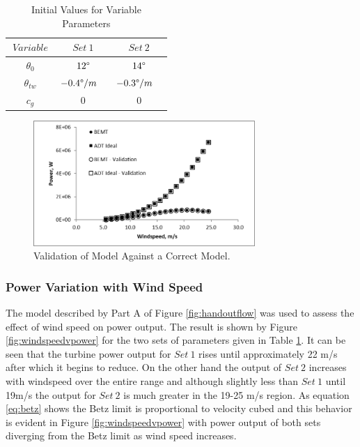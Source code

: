 \documentclass[11pt]{article}
\newcommand{\ra}[1]{\renewcommand{\arraystretch}{#1}}
\begin{document}
\begin{table}[!h]
\centering %
\ra{1.3}
\begin{tabular}{@{}ccc@{}}\toprule
 $\ Variable \ $ & $Set \ 1$ &  $Set \ 2 $\\
\midrule
$\theta_0$ & $ 12\degree$ & $ 14\degree$ \\
$\theta_{tw}$ & $ -0.4\degree/m$ \ & $ -0.3\degree/m$ \ \\
$c_{g}$ & 0 & 0\\
\bottomrule
\end{tabular}
\caption{Initial Values for Variable Parameters}
\label{table:setvar}
\end{table}


\begin{figure}
\centering
	\includegraphics[width=0.75\textwidth]{validation}
	\caption{Validation of Model Against a Correct Model.}\label{fig:validation}
\end{figure}
 \FloatBarrier
\subsubsection{Power Variation with Wind Speed}
The model described by Part A  of Figure \ref{fig:handoutflow} was used to assess the effect of wind speed on power output. The result is shown by Figure \ref{fig:windspeedvpower} for the two sets of parameters given in Table \ref{table:setvar}. It can be seen that the turbine power output for $Set \ 1$ rises until approximately 22 m/s after which it begins to reduce. On the other hand the output of $Set \ 2$ increases with windspeed over the entire range and although slightly less than $Set \ 1$ until 19m/s the output for $Set \ 2$ is much greater in the 19-25 m/s region. As equation \ref{eq:betz} shows the Betz limit is proportional to velocity cubed and this behavior is evident in Figure  \ref{fig:windspeedvpower} with power output of both sets diverging from the Betz limit as wind speed increases.
\end{document}
